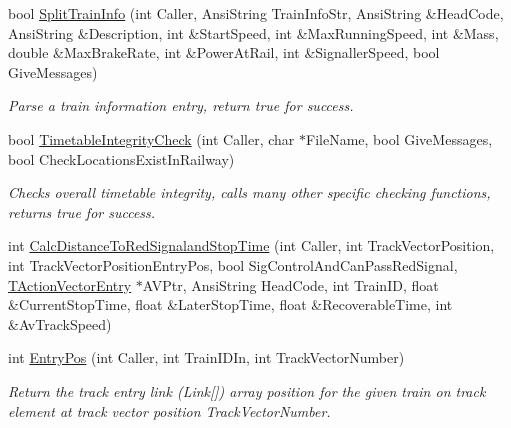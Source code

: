 \begin{DoxyCompactItemize}
\mbox{\label{class_t_train_controller_afa4be4bca19620319c9e65eb0b43daa1}} 
bool \mbox{\hyperlink{class_t_train_controller_afa4be4bca19620319c9e65eb0b43daa1}{Split\+Train\+Info}} (int Caller, Ansi\+String Train\+Info\+Str, Ansi\+String \&Head\+Code, Ansi\+String \&Description, int \&Start\+Speed, int \&Max\+Running\+Speed, int \&Mass, double \&Max\+Brake\+Rate, int \&Power\+At\+Rail, int \&Signaller\+Speed, bool Give\+Messages)
\begin{DoxyCompactList}\small\item\em Parse a train information entry, return true for success. \end{DoxyCompactList}\item 
\mbox{\label{class_t_train_controller_ac51af4807fe6bba453f8ab9bba42e2b5}} 
bool \mbox{\hyperlink{class_t_train_controller_ac51af4807fe6bba453f8ab9bba42e2b5}{Timetable\+Integrity\+Check}} (int Caller, char $\ast$File\+Name, bool Give\+Messages, bool Check\+Locations\+Exist\+In\+Railway)
\begin{DoxyCompactList}\small\item\em Checks overall timetable integrity, calls many other specific checking functions, returns true for success. \end{DoxyCompactList}\item 
int \mbox{\hyperlink{class_t_train_controller_ad81afe17a036ab3f96c340ab75a2d8e2}{Calc\+Distance\+To\+Red\+Signaland\+Stop\+Time}} (int Caller, int Track\+Vector\+Position, int Track\+Vector\+Position\+Entry\+Pos, bool Sig\+Control\+And\+Can\+Pass\+Red\+Signal, \mbox{\hyperlink{class_t_action_vector_entry}{T\+Action\+Vector\+Entry}} $\ast$A\+V\+Ptr, Ansi\+String Head\+Code, int Train\+ID, float \&Current\+Stop\+Time, float \&Later\+Stop\+Time, float \&Recoverable\+Time, int \&Av\+Track\+Speed)
\item 
\mbox{\label{class_t_train_controller_aa60ab73bef848c5458cdf0217092aef8}} 
int \mbox{\hyperlink{class_t_train_controller_aa60ab73bef848c5458cdf0217092aef8}{Entry\+Pos}} (int Caller, int Train\+I\+D\+In, int Track\+Vector\+Number)
\begin{DoxyCompactList}\small\item\em Return the track entry link (Link\mbox{[}\mbox{]}) array position for the given train on track element at track vector position Track\+Vector\+Number. \end{DoxyCompactList}\item 

\end{DoxyCompactItemize}
